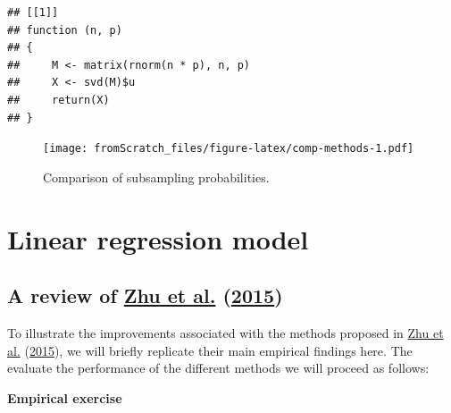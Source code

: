 \documentclass[
]{book}
\newenvironment{Shaded}{\begin{snugshade}}{\end{snugshade}}
\newcommand{\ControlFlowTok}[1]{\textcolor[rgb]{0.13,0.29,0.53}{\textbf{#1}}}
\newcommand{\FunctionTok}[1]{\textcolor[rgb]{0.00,0.00,0.00}{#1}}
\newcommand{\NormalTok}[1]{#1}
\newcommand{\OtherTok}[1]{\textcolor[rgb]{0.56,0.35,0.01}{#1}}
\newcommand{\SpecialCharTok}[1]{\textcolor[rgb]{0.00,0.00,0.00}{#1}}
\begin{document}
\begin{Shaded}
\end{Shaded}

\begin{verbatim}
## [[1]]
## function (n, p) 
## {
##     M <- matrix(rnorm(n * p), n, p)
##     X <- svd(M)$u
##     return(X)
## }
\end{verbatim}

\begin{figure}
\centering
\texttt{[image: fromScratch\_files/figure-latex/comp-methods-1.pdf]}
\caption{\label{fig:comp-methods}Comparison of subsampling probabilities.}
\end{figure}

\hypertarget{lin-reg}{%
\section{Linear regression model}\label{lin-reg}}

\hypertarget{a-review-of-zhu2015optimal}{%
\subsection{\texorpdfstring{A review of \protect\hyperlink{ref-zhu2015optimal}{Zhu et al.} (\protect\hyperlink{ref-zhu2015optimal}{2015})}{A review of Zhu et al. (2015)}}\label{a-review-of-zhu2015optimal}}

To illustrate the improvements associated with the methods proposed in \protect\hyperlink{ref-zhu2015optimal}{Zhu et al.} (\protect\hyperlink{ref-zhu2015optimal}{2015}), we will briefly replicate their main empirical findings here. The evaluate the performance of the different methods we will proceed as follows:

\textbf{Empirical exercise}
\end{document}
